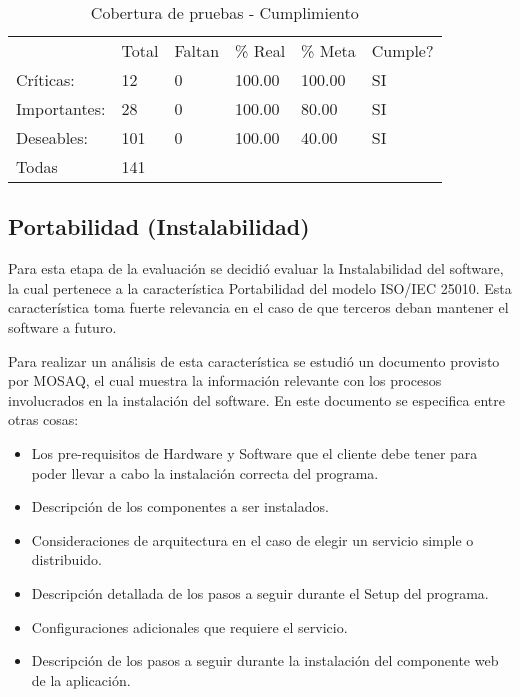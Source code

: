 \begin{table}[hb]
\centering
    \begin{tabular}{llllll}
    ~               &  		Total &  		Faltan &  		\% Real &  		\% Meta & Cumple? \\
     		Críticas:    &  		12    & 0         &  		100.00 &  		100.00 &  		SI    \\
     		Importantes: &  		28    & 0         &  		100.00 &  		80.00  &  		SI    \\
     		Deseables:   &  		101   & 0         &  		100.00 &  		40.00  &  		SI    \\
     		Todas        &  		141   & ~         & ~         & ~         & ~        \\ \hline
    \end{tabular}
         \caption{Cobertura de pruebas - Cumplimiento}
    \label{table:CBC}
\end{table}

\subsection{Portabilidad (Instalabilidad)}
\label{ins}
Para esta etapa de la evaluación se decidió evaluar la Instalabilidad del software, la cual pertenece
a la característica Portabilidad del modelo ISO/IEC 25010. Esta característica toma fuerte relevancia
en el caso de que terceros deban mantener el software a futuro.

Para realizar un análisis de esta característica se estudió un documento provisto por MOSAQ, el cual
muestra la información relevante con los procesos involucrados en la instalación del software.
En este documento se especifica entre otras cosas:

\begin{itemize}
\item Los pre-requisitos de Hardware y Software que el cliente debe tener para poder llevar a cabo la instalación correcta del programa.
\item Descripción de los componentes a ser instalados.
\item Consideraciones de arquitectura en el caso de elegir un servicio simple o distribuido.
\item Descripción detallada de los pasos a seguir durante el Setup del programa.
\item Configuraciones adicionales que requiere el servicio.
\item Descripción de los pasos a seguir durante la instalación del componente web de la aplicación.
\end{itemize}

